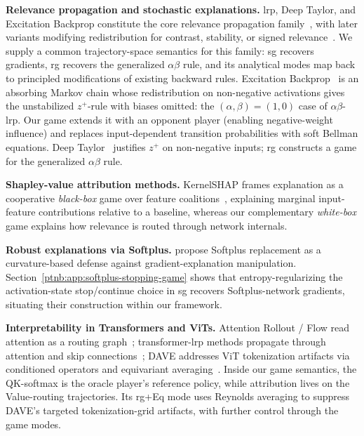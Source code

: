 \textbf{Relevance propagation and stochastic explanations.} \ac{lrp}, Deep Taylor, and Excitation
Backprop constitute the core relevance propagation family~\parencite{Bach2015,Montavon2017DeepTaylor,Zhang2018pointinggame}, with later variants modifying redistribution for contrast, stability, or
signed relevance~\parencite{Binder2016LRN,Kohlbrenner2020,Gu2019CLRP,Nam2020,vukadin2024abslrp}. We supply
a common trajectory-space semantics for this family: \ac{sg} recovers gradients, \ac{rg} recovers
the generalized $\alpha\beta$ rule, and its analytical modes map back to principled modifications
of existing backward rules.
Excitation Backprop~\parencite{Zhang2018pointinggame} is an absorbing Markov chain whose redistribution
on non-negative activations gives the unstabilized $z^+$-rule with biases omitted: the
$(\alpha,\beta)=(1,0)$ case of $\alpha\beta$-\ac{lrp}. Our game extends it with an opponent player (enabling negative-weight influence) and replaces
input-dependent transition probabilities with soft Bellman equations.
Deep Taylor~\parencite{Montavon2017DeepTaylor} justifies $z^+$ on non-negative inputs;
\ac{rg} constructs a game for the generalized $\alpha\beta$ rule.

\textbf{Shapley-value attribution methods.} KernelSHAP frames explanation as a cooperative \emph{black-box} game over feature coalitions~\parencite{LundbergLee2017}, explaining marginal input-feature contributions relative to a
baseline, whereas our complementary \emph{white-box} game explains how relevance is routed through network internals.

\textbf{Robust explanations via Softplus.} \textcite{Dombrowski2020} propose Softplus replacement as a
curvature-based defense against gradient-explanation manipulation.
Section~\ref{ptnb:app:softplus-stopping-game} shows that entropy-regularizing the activation-state
stop/continue choice in \ac{sg} recovers Softplus-network gradients, situating their construction
within our framework.

\textbf{Interpretability in Transformers and ViTs.} Attention Rollout / Flow read attention as a routing
graph~\parencite{Abnar2020attention}; transformer-\ac{lrp} methods propagate through attention and skip
connections~\parencite{Chefer2021GenericAttention,Ali2022AttnLRP,Achtibat2024AttnLRP}; DAVE addresses ViT
tokenization artifacts via conditioned operators and equivariant averaging~\parencite{Wrobel2024}.
Inside our game semantics, the QK-softmax is the oracle player's reference policy, while attribution lives on the Value-routing
trajectories. Its \ac{rg}+Eq mode uses Reynolds averaging to suppress
DAVE's targeted tokenization-grid artifacts, with further control through the game modes.
